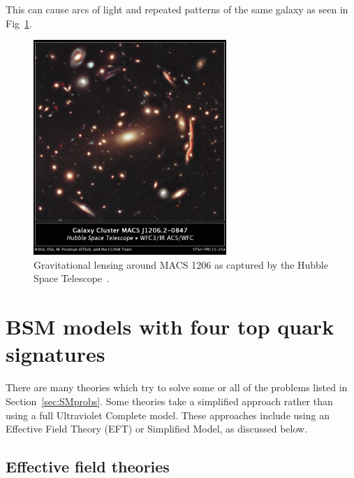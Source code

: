 This can cause arcs of light and repeated patterns of the same galaxy as seen in Fig~\ref{fig:Glens}.
\begin{figure}[ht!]
\centering
    \includegraphics[width=0.65\textwidth]{images/Theory/lensing2.jpg}
    \caption{Gravitational lensing around MACS 1206 as captured by the Hubble Space Telescope~\cite{Glens}.}
    \label{fig:Glens}
\end{figure}


\section{BSM models with four top quark signatures ~\label{sec:BSMmodels}}

There are many theories which try to solve some or all of the problems listed in Section~\ref{sec:SMprobs}. Some theories take a simplified approach rather than using a full Ultraviolet Complete model. These approaches include using an Effective Field Theory (EFT) or Simplified Model, as discussed below.

\subsection{Effective field theories}

